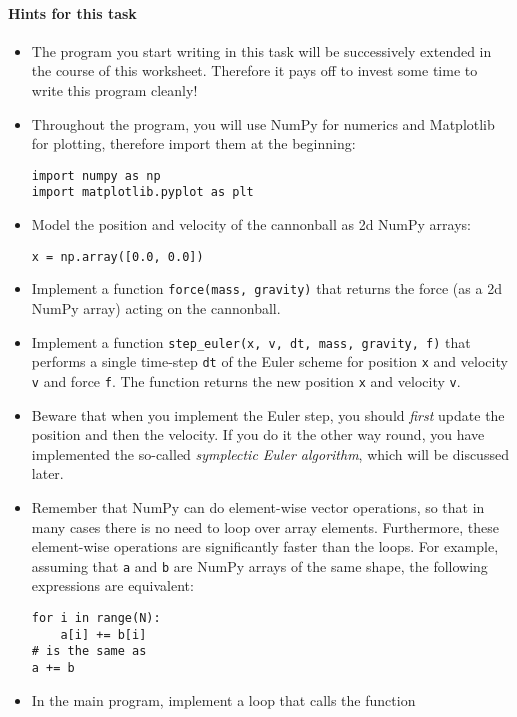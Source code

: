 \paragraph{Hints for this task}
%
\begin{itemize}
  \item The program you start writing in this task will be successively
    extended in the course of this worksheet. 
    Therefore it pays off to invest some time to write this program cleanly!
  \item Throughout the program, you will use NumPy for numerics and Matplotlib
    for plotting, therefore import them at the beginning:
    \begin{lstlisting}
import numpy as np
import matplotlib.pyplot as plt
    \end{lstlisting}
  \item Model the position and velocity of the cannonball as 2d NumPy arrays:
    \begin{lstlisting}
x = np.array([0.0, 0.0])
    \end{lstlisting}
  \item Implement a function \lstinline!force(mass, gravity)! that returns the
    force (as a 2d NumPy array) acting on the cannonball.
  \item Implement a function \lstinline!step_euler(x, v, dt, mass, gravity, f)! that
    performs a single time-step \lstinline!dt! of the Euler scheme for
    position \lstinline!x! and velocity \lstinline!v! and force \lstinline!f!.
    The function returns the new position \lstinline!x!  and velocity
    \lstinline!v!.
  \item Beware that when you implement the Euler step, you should \emph{first}
    update the position and then the velocity. 
    If you do it the other way round, you have implemented the so-called
    \emph{symplectic Euler algorithm}, which will be discussed later.
  \item Remember that NumPy can do element-wise vector operations, so that in
    many cases there is no need to loop over array elements. 
    Furthermore, these element-wise operations are significantly faster than the
    loops.  
    For example, assuming that \lstinline!a! and \lstinline!b! are NumPy arrays
    of the same shape, the following expressions are equivalent:
    \begin{lstlisting}
for i in range(N):
    a[i] += b[i]
# is the same as
a += b
    \end{lstlisting}
  \item In the main program, implement a loop that calls the function

\end{itemize}
